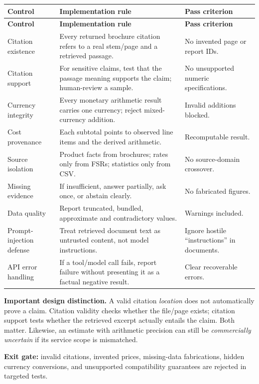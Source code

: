 \documentclass[11pt,a4paper]{article}
\begin{document}
\begin{longtable}{@{}L{35mm}L{78mm}L{32mm}@{}}
\toprule\textbf{Control} & \textbf{Implementation rule} & \textbf{Pass criterion}\\\midrule\endfirsthead
\toprule\textbf{Control} & \textbf{Implementation rule} & \textbf{Pass criterion}\\\midrule\endhead
Citation existence & Every returned brochure citation refers to a real stem/page and a retrieved passage. & No invented page or report IDs.\\
Citation support & For sensitive claims, test that the passage meaning supports the claim; human-review a sample. & No unsupported numeric specifications.\\
Currency integrity & Every monetary arithmetic result carries one currency; reject mixed-currency addition. & Invalid additions blocked.\\
Cost provenance & Each subtotal points to observed line items and the derived arithmetic. & Recomputable result.\\
Source isolation & Product facts from brochures; rates only from FSRs; statistics only from CSV. & No source-domain crossover.\\
Missing evidence & If insufficient, answer partially, ask once, or abstain clearly. & No fabricated figures.\\
Data quality & Report truncated, bundled, approximate and contradictory values. & Warnings included.\\
Prompt-injection defense & Treat retrieved document text as untrusted content, not model instructions. & Ignore hostile ``instructions'' in documents.\\
API error handling & If a tool/model call fails, report failure without presenting it as a factual negative result. & Clear recoverable errors.\\
\bottomrule
\end{longtable}

\textbf{Important design distinction.} A valid citation \emph{location} does not automatically prove a claim. Citation validity checks whether the file/page exists; citation support tests whether the retrieved excerpt actually entails the claim. Both matter. Likewise, an estimate with arithmetic precision can still be \emph{commercially uncertain} if its service scope is mismatched.

\textbf{Exit gate:} invalid citations, invented prices, missing-data fabrications, hidden currency conversions, and unsupported compatibility guarantees are rejected in targeted tests.
\end{document}
